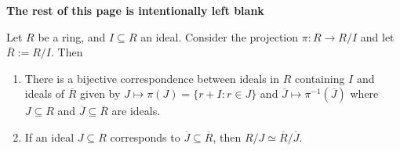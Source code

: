 \documentclass [12pt] {article}
\newenvironment{theorem}[1]{\begin{tcolorbox}[title={Theorem #1},colback=green!5!white,colframe=black!75!green]}{\end{tcolorbox}}
\renewcommand{\bf}[1]{\textbf{{#1}}}
\begin{document}
\begin{center}
    \vspace{5em}
    \bf{The rest of this page is intentionally left blank}
\end{center}

\newpage
\begin{theorem}{(Correspondence Theorem)}
    Let $R$ be a ring, and $I \subseteq R$ an ideal. Consider the projection $\pi : R \to R/I$ and
    let $\overline{R} := R/I$. Then
    \begin{enumerate}[label=(\arabic*)]
        \item There is a bijective correspondence between ideals in $R$ containing $I$ and ideals of
            $\overline{R}$ given by $J \mapsto \pi(J) = \{ r + I : r \in J \}$ and
            $\overline{J} \mapsto \pi^{-1}(\overline{J})$ where $J \subseteq R$ and
            $\overline{J} \subseteq \overline{R}$ are ideals.
        \item If an ideal $J \subseteq R$ corresponds to $\overline{J} \subseteq \overline{R}$, then
            $R/J \simeq \overline{R}/\overline{J}$.
    \end{enumerate}
\end{theorem}
\end{document}

